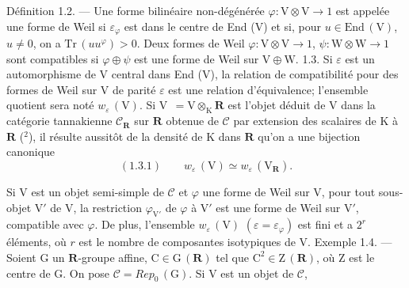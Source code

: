 Définition 1.2. --- Une forme bilinéaire non-dégénérée $\varphi : \mathrm{V}\otimes\mathrm{V} \to 1$
est appelée une forme de Weil si $\varepsilon_{\varphi}$ est dans le centre de End (V) et si,
pour $u\in\mathrm{End}\,(\mathrm{V})$, $u\neq 0$, on a $\mathrm{Tr}\,(uu^{\varphi}) > 0$. Deux formes de Weil
$\varphi : \mathrm{V}\otimes\mathrm{V} \to 1$, $\psi : \mathrm{W}\otimes\mathrm{W} \to 1$ sont compatibles si $\varphi\oplus\psi$ est une forme
de Weil sur $\mathrm{V}\oplus\mathrm{W}$.
1.3. Si $\varepsilon$ est un automorphisme de V central dans End (V), la relation
de compatibilité pour des formes de Weil sur V de parité $\varepsilon$ est une relation
d'équivalence; l'ensemble quotient sera noté $w_{\varepsilon}\,(\mathrm{V})$. Si $\mathrm{V}\ \ = \mathrm{V}\otimes_{\mathrm{K}}\mathbf{R}$ est
l'objet déduit de V dans la catégorie tannakienne $\mathcal{C}_{\mathbf{R}}$ sur $\mathbf{R}$ obtenue de $\mathcal{C}$
par extension des scalaires de K à $\mathbf{R}$ (${}^2$), il résulte aussitôt de la densité
de K dans $\mathbf{R}$ qu'on a une bijection canonique
\[ (1.3.1) \qquad w_{\varepsilon}\,(\mathrm{V}) \simeq w_{\varepsilon}\,(\mathrm{V}_{\mathbf{R}}). \]

Si V est un objet semi-simple de $\mathcal{C}$ et $\varphi$ une forme de Weil sur V, pour tout
sous-objet V$'$ de V, la restriction $\varphi_{\mathrm{V}'}$ de $\varphi$ à V$'$ est une forme de Weil sur V$'$,
compatible avec $\varphi$. De plus, l'ensemble $w_{\varepsilon}\,(\mathrm{V})$ $(\varepsilon = \varepsilon_{\varphi})$ est fini et a
$2^{r}$ éléments, où $r$ est le nombre de composantes isotypiques de V.
Exemple 1.4. --- Soient G un $\mathbf{R}$-groupe affine, $\mathrm{C}\in\mathrm{G}\,(\mathbf{R})$ tel que $\mathrm{C}^{2}\in\mathrm{Z}\,(\mathbf{R})$,
où Z est le centre de G. On pose $\mathcal{C} = \mathit{Rep}_0\,(\mathrm{G})$. Si V est un objet de $\mathcal{C}$,

